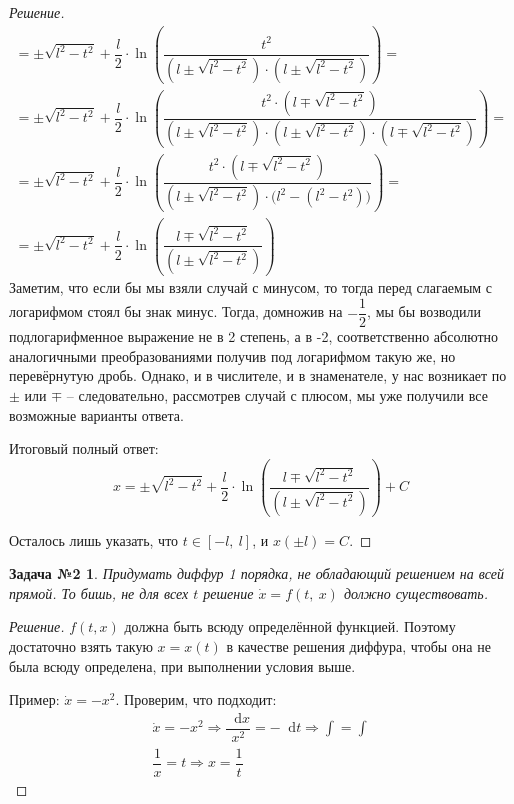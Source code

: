 \documentclass[a4paper,12pt]{article}
\newtheorem*{task2}{Задача №2}
\renewcommand*\d{\mathop{}\!\mathrm{d}}
\newcommand{\dx}{\dot{x}}
\newcommand{\ds}{\displaystyle}
\begin{document}
\begin{proof}[Решение]
\begin{gather*}
		= \ds\pm \sqrt{l^2 - t^2} + \dfrac{l}{2}\cdot \ln\left(\dfrac{t^2}{(l \pm \sqrt{l^2 - t^2})\cdot(l \pm \sqrt{l^2 - t^2})}\right) = \\
		= \ds\pm \sqrt{l^2 - t^2} + \dfrac{l}{2}\cdot \ln\left(\dfrac{t^2\cdot (l \mp \sqrt{l^2 - t^2})}{(l \pm \sqrt{l^2 - t^2})\cdot(l \pm \sqrt{l^2 - t^2})\cdot (l \mp \sqrt{l^2 - t^2})}\right) = \\
		= \ds\pm \sqrt{l^2 - t^2} + \dfrac{l}{2}\cdot \ln\left(\dfrac{t^2\cdot (l \mp \sqrt{l^2 - t^2})}{(l \pm \sqrt{l^2 - t^2})\cdot\big(l^2 - (l^2 - t^2)\big)}\right) = \\
		= \ds\pm \sqrt{l^2 - t^2} + \dfrac{l}{2}\cdot \ln\left(\dfrac{l \mp \sqrt{l^2 - t^2}}{(l \pm \sqrt{l^2 - t^2})}\right)
	\end{gather*}
	Заметим, что если бы мы взяли случай с минусом, то тогда перед слагаемым с логарифмом стоял бы знак минус. Тогда, домножив на $-\dfrac{1}{2}$, мы бы возводили подлогарифменное выражение не в 2 степень, а в -2, соответственно абсолютно аналогичными преобразованиями получив под логарифмом такую же, но перевёрнутую дробь. Однако, и в числителе, и в знаменателе, у нас возникает по $\pm$ или $\mp$ -- следовательно, рассмотрев случай с плюсом, мы уже получили все возможные варианты ответа.
	
	Итоговый полный ответ:
	\[x = \ds\pm \sqrt{l^2 - t^2} + \dfrac{l}{2}\cdot \ln\left(\dfrac{l \mp \sqrt{l^2 - t^2}}{(l \pm \sqrt{l^2 - t^2})}\right) + C\]
	
	Осталось лишь указать, что $t \in [-l,\ l]$, и $x(\pm l) = C$. 
\end{proof}

\begin{task2}
	Придумать диффур 1 порядка, не обладающий решением на всей прямой. То бишь, не для всех $t$ решение $\dot{x} = f(t,\ x)$ должно существовать. 
\end{task2}
\begin{proof}[Решение]
	$f(t, x)$  должна быть всюду определённой функцией. Поэтому достаточно взять такую $x = x(t)$ в качестве решения диффура, чтобы она не была всюду определена, при выполнении условия выше.
	
	Пример: $\dx = -x^2$. Проверим, что подходит:
	\begin{gather*}
		\dx = -x^2 \Longrightarrow \dfrac{\d x}{x^2} = -\d t \Longrightarrow \ds\int = \int\\
		\dfrac{1}{x} = t \Longrightarrow x = \dfrac{1}{t}
	\end{gather*}
\end{proof}
\end{document}
